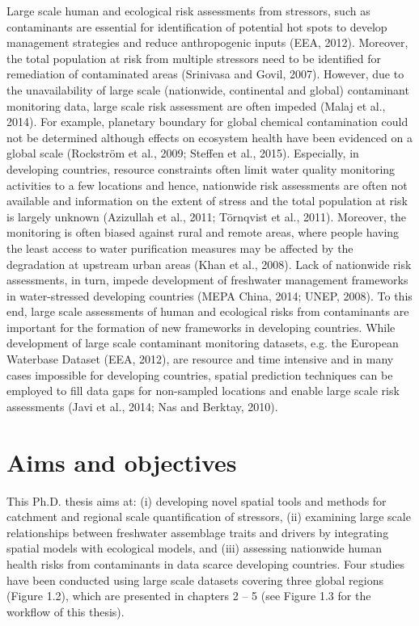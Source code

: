 Large scale human and ecological risk assessments from stressors, such as contaminants are essential for identification of potential hot spots to develop management strategies and reduce anthropogenic inputs (EEA, 2012). Moreover, the total population at risk from multiple stressors need to be identified for remediation of contaminated areas (Srinivasa and Govil, 2007). However, due to the unavailability of large scale (nationwide, continental and global) contaminant monitoring data, large scale risk assessment are often impeded (Malaj et al., 2014). For example, planetary boundary for global chemical contamination could not be determined although effects on ecosystem health have been evidenced on a global scale (Rockström et al., 2009; Steffen et al., 2015). Especially, in developing countries, resource constraints often limit water quality monitoring activities to a few locations and hence, nationwide risk assessments are often not available and information on the extent of stress and the total population at risk is largely unknown (Azizullah et al., 2011; Törnqvist et al., 2011). Moreover, the monitoring is often biased against rural and remote areas, where people having the least access to water purification measures may be affected by the degradation at upstream urban areas (Khan et al., 2008). Lack of nationwide risk assessments, in turn, impede development of freshwater management frameworks in water-stressed developing countries (MEPA China, 2014; UNEP, 2008). To this end, large scale assessments of human and ecological risks from contaminants are important for the formation of new frameworks in developing countries. While development of large scale contaminant monitoring datasets, e.g. the European Waterbase Dataset (EEA, 2012), are resource and time intensive and in many cases impossible for developing countries, spatial prediction techniques can be employed to fill data gaps for non-sampled locations and enable large scale risk assessments (Javi et al., 2014; Nas and Berktay, 2010).

\section{Aims and objectives}
\label{Aims and objectives}

This Ph.D. thesis aims at: (i) developing novel spatial tools and methods for catchment and regional scale quantification of stressors, (ii) examining large scale relationships between freshwater assemblage traits and drivers by integrating spatial models with ecological models, and (iii) assessing nationwide human health risks from contaminants in data scarce developing countries. Four studies have been conducted using large scale datasets covering three global regions (Figure 1.2), which are presented in chapters 2 – 5 (see Figure 1.3 for the workflow of this thesis).

